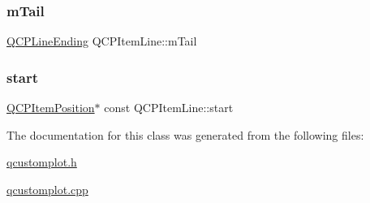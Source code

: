 \mbox{\label{class_q_c_p_item_line_ab8ed61dfe15bbb1cbf9b95eae95e242f}} 
\subsubsection{\texorpdfstring{m\+Tail}{mTail}}
{\footnotesize\ttfamily \hyperlink{class_q_c_p_line_ending}{Q\+C\+P\+Line\+Ending} Q\+C\+P\+Item\+Line\+::m\+Tail\hspace{0.3cm}{\ttfamily [protected]}}

\mbox{\label{class_q_c_p_item_line_a602da607a09498b0f152ada1d6851bc5}} 
\subsubsection{\texorpdfstring{start}{start}}
{\footnotesize\ttfamily \hyperlink{class_q_c_p_item_position}{Q\+C\+P\+Item\+Position}$\ast$ const Q\+C\+P\+Item\+Line\+::start}



The documentation for this class was generated from the following files\+:\begin{DoxyCompactItemize}
\item 
\hyperlink{qcustomplot_8h}{qcustomplot.\+h}\item 
\hyperlink{qcustomplot_8cpp}{qcustomplot.\+cpp}\end{DoxyCompactItemize}
